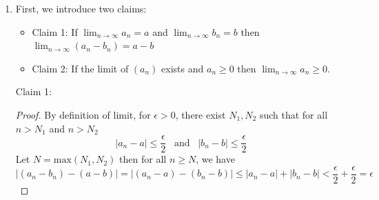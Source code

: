 \documentclass[10pt,letterpaper]{article}
\begin{document}
	\begin{enumerate}[label=(\roman{*})]
		\item First, we introduce two claims:
		\begin{itemize}
			\item Claim 1: If $\displaystyle\lim_{n\to\infty} a_n = a$ and 
			$\displaystyle\lim_{n\to\infty} b_n = b$ then
			$\displaystyle\lim_{n\to\infty} (a_n - b_n) = a - b$
			\item Claim 2: If the limit of $(a_n)$ exists and $a_n \geq 0$ then $\displaystyle\lim_{n\to\infty} a_n \geq 0$.
		\end{itemize}
		Claim 1:
		\begin{proof}
			By definition of limit, for $\epsilon > 0$, there exist $N_1, N_2$ such that for all $n > N_1$ and $n > N_2$
			$$|a_n - a| \leq \dfrac{\epsilon}{2} \,\,\, \text{ and } 
			\, \, \, |b_n - b| \leq \dfrac{\epsilon}{2}$$
			Let $N = \mathrm{max}(N_1, N_2)$ then for all $n \geq N$, we have
			$$|(a_n - b_n) - (a - b)| = |(a_n - a) - (b_n - b)| \leq 
			|a_n - a| + |b_n - b| < \dfrac{\epsilon}{2} + \dfrac{\epsilon}{2} = \epsilon$$ 
			

\end{proof}
\end{enumerate}
\end{document}
